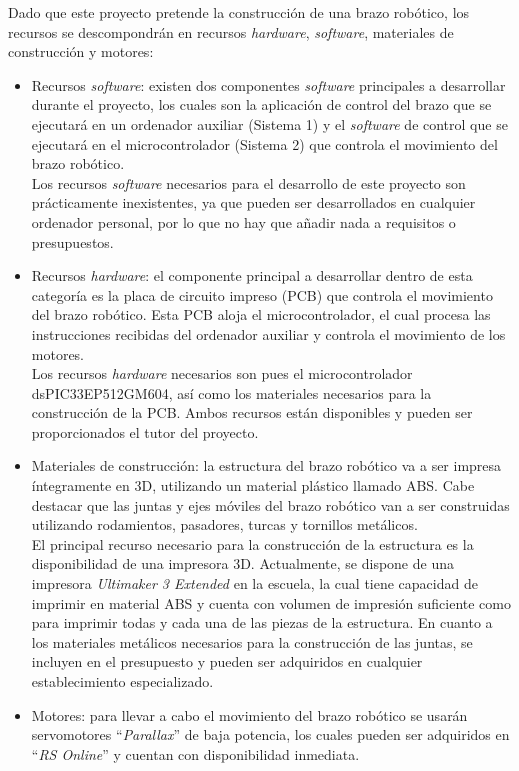 
Dado que este proyecto pretende la construcción de una brazo robótico, los recursos se descompondrán en recursos \textit{hardware}, \textit{software}, materiales de construcción y motores:
\begin{itemize}
    \item Recursos \textit{software}: existen dos componentes \textit{software} principales a desarrollar durante el proyecto, los cuales son la aplicación de control del brazo que se ejecutará en un ordenador auxiliar (Sistema 1) y el \textit{software} de control que se ejecutará en el microcontrolador (Sistema 2) que controla el movimiento del brazo robótico.\\ 
    Los recursos \textit{software} necesarios para el desarrollo de este proyecto son prácticamente inexistentes, ya que pueden ser desarrollados en cualquier ordenador personal, por lo que no hay que añadir nada a requisitos o presupuestos.
    
    \item Recursos \textit{hardware}: el componente principal a desarrollar dentro de esta categoría es la placa de circuito impreso (PCB) que controla el movimiento del brazo robótico. Esta PCB aloja el microcontrolador, el cual procesa las instrucciones recibidas del ordenador auxiliar y controla el movimiento de los motores.\\
    Los recursos \textit{hardware} necesarios son pues el microcontrolador dsPIC33EP512GM604, así como los materiales necesarios para la construcción de la PCB. Ambos recursos están disponibles y pueden ser proporcionados el tutor del proyecto. 
    
    \item Materiales de construcción: la estructura del brazo robótico va a ser impresa íntegramente en 3D, utilizando un material plástico llamado ABS. Cabe destacar que las juntas y ejes móviles del brazo robótico van a ser construidas utilizando rodamientos, pasadores, turcas y tornillos  metálicos.\\
    El principal recurso necesario para la construcción de la estructura es la disponibilidad de una impresora 3D. Actualmente, se dispone de una impresora \textit{Ultimaker 3 Extended} en la escuela, la cual tiene capacidad de imprimir en material ABS y cuenta con volumen de impresión suficiente como para imprimir todas y cada una de las piezas de la estructura. En cuanto a los materiales metálicos necesarios para la construcción de las juntas, se incluyen en el presupuesto y pueden ser adquiridos en cualquier establecimiento especializado.
    
    \item Motores: para llevar a cabo el movimiento del brazo robótico se usarán servomotores ``\textit{Parallax}'' de baja potencia, los cuales pueden ser adquiridos en ``\textit{RS Online}'' y cuentan con disponibilidad inmediata.
\end{itemize}

